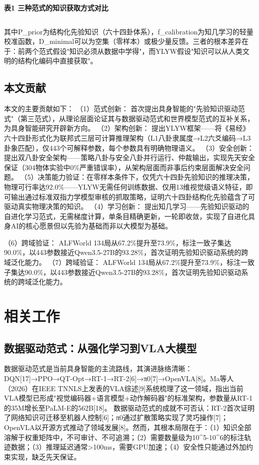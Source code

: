 \documentclass[12pt,a4paper]{article}
\begin{document}
\begin{center}
\textbf{表1  三种范式的知识获取方式对比}
\begin{tabular}{lcccc}
\hline
\end{tabular}
\end{center}
其中P\_prior为结构化先验知识（六十四卦体系），f\_calibration为知几学习的轻量校准函数，D\_minimal可以为空集（零样本）或极少量反馈。三者的根本差异在于：前两个范式假设"知识必须从数据中学得"，而YLYW假设"知识可以从人类文明的结构化编码中直接获取"。

\subsection{本文贡献}
本文的主要贡献如下：
（1）范式创新： 首次提出具身智能的"先验知识驱动范式"（第三范式），从理论层面论证其与数据驱动范式和世界模型范式的互补关系，为具身智能研究开辟新方向。
（2）架构创新： 提出YLYW框架——将《易经》六十四卦形式化为联邦式三层可计算推理架构（L1八卦隶属度→L2六爻编码→L3卦象匹配），仅443个可解释参数，每个参数具有明确物理语义。
（3）安全创新： 提出双八卦安全架构——策略八卦与安全八卦并行运行、仲裁输出，实现先天安全保证（304物体实验中0\%严重错误率），从架构层面而非事后约束层面解决安全问题。
（5）决策能力验证：在零样本条件下，仅凭六十四卦先验知识的推理决策，物理可行率达92.0\%——YLYW无需任何训练数据、仅用13维视觉级语义特征，即可输出通过标准双指力学模型审核的抓取策略，证明六十四卦结构化先验蕴含了可驱动真实物理决策的知识。
（4）学习创新： 提出知几学习——先验知识驱动的自进化学习范式，无需梯度计算，单条目精确更新，一轮即收敛，实现了自进化具身AI的核心愿景但以先验为基础而非以大模型为基础。

（6）跨域验证： ALFWorld 134局从67.2\%提升至73.9\%，标注一致子集达90.0\%，以443参数接近Qwen3.5-27B的93.28\%，首次证明先验知识驱动系统的跨域泛化能力。
（7）跨域验证： ALFWorld 134局从67.2\%提升至73.9\%，标注一致子集达90.0\%，以443参数接近Qwen3.5-27B的93.28\%，首次证明先验知识驱动系统的跨域泛化能力。

\section{相关工作}

\subsection{数据驱动范式：从强化学习到VLA大模型}
数据驱动范式是当前具身智能的主流路线，其演进脉络清晰：DQN[17]→PPO→QT-Opt→RT-1→RT-2[6]→π0[7]→OpenVLA[8]。Ma等人（2026）在IEEE TNNLS上发表的VLA综述[9]系统梳理了这一领域，指出当前VLA模型已形成"视觉编码器+语言模型+动作解码器"的标准架构，参数量从RT-1的35M增长至PaLM-E的562B[18]。
数据驱动范式的成就不可否认：RT-2首次证明了网络知识可迁移至机器人控制[6]；π0通过扩散策略实现了灵巧操作[7]；OpenVLA以开源方式推动了领域发展[8]。然而，其根本局限在于：（1）知识全部溶解于权重矩阵中，不可审计、不可追溯；（2）需要数量级为10^5-10^6的标注轨迹数据；（3）推理延迟通常>100ms，需要GPU加速；（4）安全性只能通过外加约束实现，缺乏先天保证。
\end{document}
